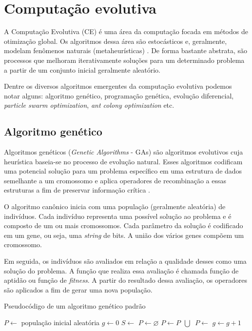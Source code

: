 \section{Computação evolutiva}
\label{sec:evolutionary-computation}

A Computação Evolutiva (CE) é uma área da computação focada em métodos de otimização global. Os algoritmos dessa área são estocásticos e, geralmente, modelam fenômenos naturais (metaheurísticas) \cite{michalewicz1995heuristic}. De forma bastante abstrata, são processos que melhoram iterativamente soluções para um determinado problema a partir de um conjunto inicial geralmente aleatório.

Dentre os diversos algoritmos emergentes da computação evolutiva podemos notar alguns: algoritmo genético, programação genética, evolução diferencial, \textit{particle swarm optimization}, \textit{ant colony optimization} etc.

\subsection{Algoritmo genético}

Algoritmos genéticos (\textit{Genetic Algorithms} - GAs) são algoritmos evolutivos cuja heurística baseia-se no processo de evolução natural. Esses algoritmos codificam uma potencial solução para um problema específico em uma estrutura de dados semelhante a um cromossomo e aplica operadores de recombinação a essas estruturas a fim de preservar informação crítica \cite{whitley1994genetic}.

O algoritmo canônico inicia com uma população (geralmente aleatória) de indivíduos. Cada indivíduo representa uma possível solução ao problema e é composto de um ou mais cromossomos. Cada parâmetro da solução é codificado em um gene, ou seja, uma \textit{string} de bits. A união dos vários genes compõem um cromossomo.

Em seguida, os indivíduos são avaliados em relação a qualidade desses como uma solução do problema. A função que realiza essa avaliação é chamada função de aptidão ou função de \textit{fitness}. A partir do resultado dessa avaliação, os operadores são aplicados a fim de gerar uma nova população.

\begin{algorithm}[h]
    \caption{Pseudocódigo de um algoritmo genético padrão}
    \begin{algorithmic}
        \State $P \gets $ população inicial aleatória
        \State $g \gets 0$
            \State {}
            \State $S \gets$ 
            \State $P \gets \varnothing$
                \State $P \gets P \>\> \bigcup \>$ 
            \EndFor
            \State $P \gets $ 
            \State $g \gets g + 1$
        \EndWhile
    \end{algorithmic}
\end{algorithm}

